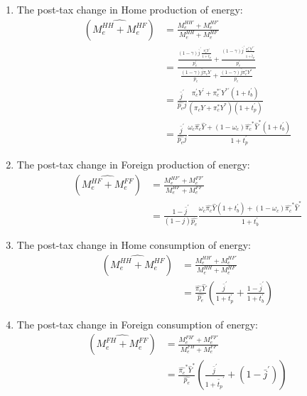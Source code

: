 \documentclass[notitlepage,12pt]{article}
\begin{document}
\begin{enumerate}
\item The post-tax change in Home production of energy:
\begin{align*}
(\hat{M_e^{HH}+M_e^{HF}}) &= \frac{M_e^{HH\prime}+M_e^{HF\prime}}{M_e^{HH}+M_e^{HF}}\\
&= \frac{\frac{(1-\gamma) \bar{j}^{\prime
} \frac{\pi _{c}^{\prime }Y^{\prime }}{1+t_{p}^{\prime }}}{p_e^\prime} + \frac{(1-\gamma) \bar{j}^{\prime
} \frac{\pi _{c}^{\ast \prime }Y^{\ast \prime }}{1+\tilde{t}_{p}^{\prime
}}}{p_e^\prime}}{\frac{(1-\gamma) \bar{j} \pi_{c}Y}{p_e} + \frac{(1-\gamma) \bar{j} \pi _c^\ast Y^\ast}{p_e}}\\
&= \frac{\bar{j}^\prime}{\hat{p_e} j} \frac{\pi_c^\prime Y^\prime + \pi_c^{\ast \prime} Y^{\ast \prime}(1+t_b^\prime)}{(\pi_c Y + \pi_c^\ast Y^\ast)(1+t_p^\prime)}\\
&= \frac{\bar{j}^\prime}{\hat{p_e} j} \frac{\omega_c \hat{\pi_c} \hat{Y} + (1-\omega_c)\hat{\pi_c}^\ast \hat{Y}^\ast (1+t_b^\prime)}{1+t_p^\prime}
\end{align*}
\item The post-tax change in Foreign production of energy:
\begin{align*}
(\hat{M_e^{HF}+M_e^{FF}}) &= \frac{M_e^{HF\prime}+M_e^{FF\prime}}{M_e^{HF}+M_e^{FF}}\\
&= \frac{1-\bar{j}^\prime}{(1-j)\hat{p_e}} \frac{\omega_c \hat{\pi_c} \hat{Y}(1+t_b^\prime) + (1-\omega_c)\hat{\pi_c}^\ast \hat{Y}^\ast }{1+t_b^\prime}
\end{align*}
\item The post-tax change in Home consumption of energy:
\begin{align*}
(\hat{M_e^{HH}+M_e^{HF}}) &= \frac{M_e^{HH\prime}+M_e^{HF\prime}}{M_e^{HH}+M_e^{HF}}\\
&= \frac{\hat{\pi_c}\hat{Y}}{\hat{p_e}}(\frac{\bar{j}^\prime}{1+t_p^\prime} + \frac{1-\bar{j}^\prime}{1+t_b^\prime})
\end{align*}
\item The post-tax change in Foreign consumption of energy:
\begin{align*}
(\hat{M_e^{FH}+M_e^{FF}}) &= \frac{M_e^{FH\prime}+M_e^{FF\prime}}{M_e^{FH}+M_e^{FF}}\\
&= \frac{\hat{\pi_c}^\ast \hat{Y}^\ast}{\hat{p_e}}(\frac{\bar{j}^\prime}{1+\tilde{t_p}^\prime} + (1-\bar{j}^\prime))
\end{align*}
\end{enumerate}
\end{document}

